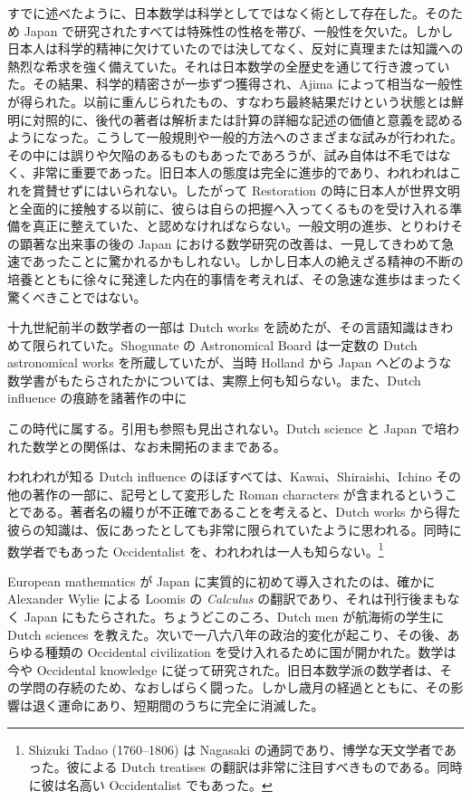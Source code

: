 \documentclass[11pt]{article}
\newcommand{\scanpage}[2]{\clearpage\setcounter{footnote}{0}\noindent{\footnotesize\color{gray}PDF #1 頁 · #2}\par\medskip}
\newcommand{\scanfooter}{}
\begin{document}
すでに述べたように、日本数学は科学としてではなく術として存在した。そのため Japan で研究されたすべては特殊性の性格を帯び、一般性を欠いた。しかし日本人は科学的精神に欠けていたのでは決してなく、反対に真理または知識への熱烈な希求を強く備えていた。それは日本数学の全歴史を通じて行き渡っていた。その結果、科学的精密さが一歩ずつ獲得され、Ajima によって相当な一般性が得られた。以前に重んじられたもの、すなわち最終結果だけという状態とは鮮明に対照的に、後代の著者は解析または計算の詳細な記述の価値と意義を認めるようになった。こうして一般規則や一般的方法へのさまざまな試みが行われた。その中には誤りや欠陥のあるものもあったであろうが、試み自体は不毛ではなく、非常に重要であった。旧日本人の態度は完全に進歩的であり、われわれはこれを賞賛せずにはいられない。したがって Restoration の時に日本人が世界文明と全面的に接触する以前に、彼らは自らの把握へ入ってくるものを受け入れる準備を真正に整えていた、と認めなければならない。一般文明の進歩、とりわけその顕著な出来事の後の Japan における数学研究の改善は、一見してきわめて急速であったことに驚かれるかもしれない。しかし日本人の絶えざる精神の不断の培養とともに徐々に発達した内在的事情を考えれば、その急速な進歩はまったく驚くべきことではない。

十九世紀前半の数学者の一部は Dutch works を読めたが、その言語知識はきわめて限られていた。Shogunate の Astronomical Board は一定数の Dutch astronomical works を所蔵していたが、当時 Holland から Japan へどのような数学書がもたらされたかについては、実際上何も知らない。また、Dutch influence の痕跡を諸著作の中に
\scanfooter


\scanpage{0192}{第22章結末および第23章冒頭、印刷頁178}
この時代に属する。引用も参照も見出されない。Dutch science と Japan で培われた数学との関係は、なお未開拓のままである。

われわれが知る Dutch influence のほぼすべては、Kawai、Shiraishi、Ichino その他の著作の一部に、記号として変形した Roman characters が含まれるということである。著者名の綴りが不正確であることを考えると、Dutch works から得た彼らの知識は、仮にあったとしても非常に限られていたように思われる。同時に数学者でもあった Occidentalist を、われわれは一人も知らない。\footnote{Shizuki Tadao (1760--1806) は Nagasaki の通詞であり、博学な天文学者であった。彼による Dutch treatises の翻訳は非常に注目すべきものである。同時に彼は名高い Occidentalist でもあった。}

European mathematics が Japan に実質的に初めて導入されたのは、確かに Alexander Wylie による Loomis の \emph{Calculus} の翻訳であり、それは刊行後まもなく Japan にもたらされた。ちょうどこのころ、Dutch men が航海術の学生に Dutch sciences を教えた。次いで一八六八年の政治的変化が起こり、その後、あらゆる種類の Occidental civilization を受け入れるために国が開かれた。数学は今や Occidental knowledge に従って研究された。旧日本数学派の数学者は、その学問の存続のため、なおしばらく闘った。しかし歳月の経過とともに、その影響は退く運命にあり、短期間のうちに完全に消滅した。
\end{document}

